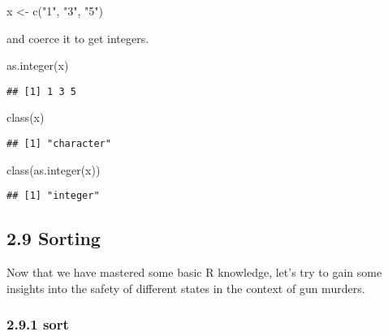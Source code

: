 \documentclass[
]{article}
\newenvironment{Shaded}{\begin{snugshade}}{\end{snugshade}}
\newcommand{\FunctionTok}[1]{\textcolor[rgb]{0.00,0.00,0.00}{#1}}
\newcommand{\NormalTok}[1]{#1}
\newcommand{\OtherTok}[1]{\textcolor[rgb]{0.56,0.35,0.01}{#1}}
\newcommand{\StringTok}[1]{\textcolor[rgb]{0.31,0.60,0.02}{#1}}
\begin{document}
\begin{Shaded}
\begin{Highlighting}[]
\NormalTok{x }\OtherTok{\textless{}{-}} \FunctionTok{c}\NormalTok{(}\StringTok{"1"}\NormalTok{, }\StringTok{"3"}\NormalTok{, }\StringTok{"5"}\NormalTok{)}
\end{Highlighting}
\end{Shaded}

and coerce it to get integers.

\begin{Shaded}
\begin{Highlighting}[]
\FunctionTok{as.integer}\NormalTok{(x)}
\end{Highlighting}
\end{Shaded}

\begin{verbatim}
## [1] 1 3 5
\end{verbatim}

\begin{Shaded}
\begin{Highlighting}[]
\FunctionTok{class}\NormalTok{(x)}
\end{Highlighting}
\end{Shaded}

\begin{verbatim}
## [1] "character"
\end{verbatim}

\begin{Shaded}
\begin{Highlighting}[]
\FunctionTok{class}\NormalTok{(}\FunctionTok{as.integer}\NormalTok{(x))}
\end{Highlighting}
\end{Shaded}

\begin{verbatim}
## [1] "integer"
\end{verbatim}

\hypertarget{sorting}{%
\subsection{2.9 Sorting}\label{sorting}}

Now that we have mastered some basic R knowledge, let's try to gain some
insights into the safety of different states in the context of gun
murders.

\hypertarget{sort}{%
\subsubsection{2.9.1 sort}\label{sort}}
\end{document}
